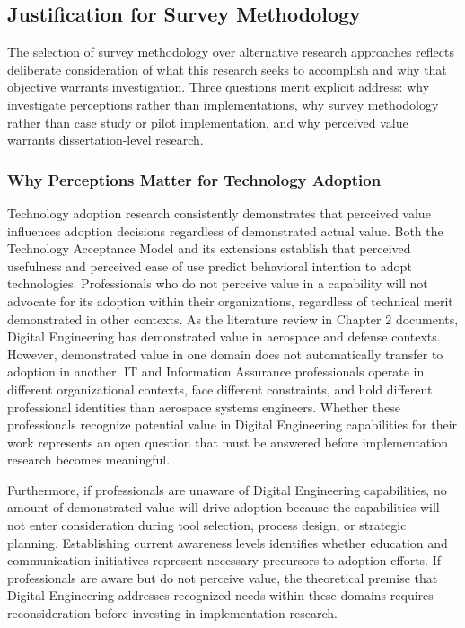 \subsection{Justification for Survey Methodology}

The selection of survey methodology over alternative research approaches reflects deliberate consideration of what this research seeks to accomplish and why that objective warrants investigation. Three questions merit explicit address: why investigate perceptions rather than implementations, why survey methodology rather than case study or pilot implementation, and why perceived value warrants dissertation-level research.

\subsubsection{Why Perceptions Matter for Technology Adoption}

Technology adoption research consistently demonstrates that perceived value influences adoption decisions regardless of demonstrated actual value. Both the Technology Acceptance Model and its extensions establish that perceived usefulness and perceived ease of use predict behavioral intention to adopt technologies. Professionals who do not perceive value in a capability will not advocate for its adoption within their organizations, regardless of technical merit demonstrated in other contexts. As the literature review in Chapter 2 documents, Digital Engineering has demonstrated value in aerospace and defense contexts. However, demonstrated value in one domain does not automatically transfer to adoption in another. IT and Information Assurance professionals operate in different organizational contexts, face different constraints, and hold different professional identities than aerospace systems engineers. Whether these professionals recognize potential value in Digital Engineering capabilities for their work represents an open question that must be answered before implementation research becomes meaningful.

Furthermore, if professionals are unaware of Digital Engineering capabilities, no amount of demonstrated value will drive adoption because the capabilities will not enter consideration during tool selection, process design, or strategic planning. Establishing current awareness levels identifies whether education and communication initiatives represent necessary precursors to adoption efforts. If professionals are aware but do not perceive value, the theoretical premise that Digital Engineering addresses recognized needs within these domains requires reconsideration before investing in implementation research.

